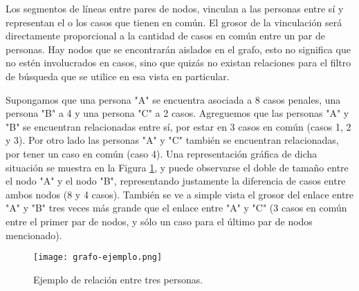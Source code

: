 Los segmentos de líneas entre pares de nodos, vinculan a las personas entre sí y representan el o los casos que tienen en común. El grosor de la vinculación será directamente proporcional a la cantidad de casos en común entre un par de personas. Hay nodos que se encontrarán aislados en el grafo, esto no significa que no estén involucrados en casos, sino que quizás no existan relaciones para el filtro de búsqueda que se utilice en esa vista en particular.

Supongamos que una persona "A" se encuentra asociada a 8 casos penales, una persona "B" a 4 y una persona "C" a 2 casos. Agreguemos que las personas "A" y "B" se encuentran relacionadas entre sí, por estar en 3 casos en común (casos 1, 2 y 3). Por otro lado las personas "A" y "C" también se encuentran relacionadas, por tener un caso en común (caso 4).  Una representación gráfica de dicha situación se muestra en la Figura \ref{fig:grafode2}, y puede observarse el doble de tamaño entre el nodo "A" y el nodo "B", representando justamente la diferencia de casos entre ambos nodos (8 y 4 casos). También se ve a simple vista el grosor del enlace entre "A" y "B" tres veces más grande que el enlace entre "A" y "C" (3 casos en común entre el primer par de nodos, y sólo un caso para el último par de nodos mencionado). 
\vspace{-10pt}
\begin{figure}
	\centering
	\texttt{[image: grafo-ejemplo.png]}
	\caption{Ejemplo de relación entre tres personas.} 
	\label{fig:grafode2}
\end{figure}
